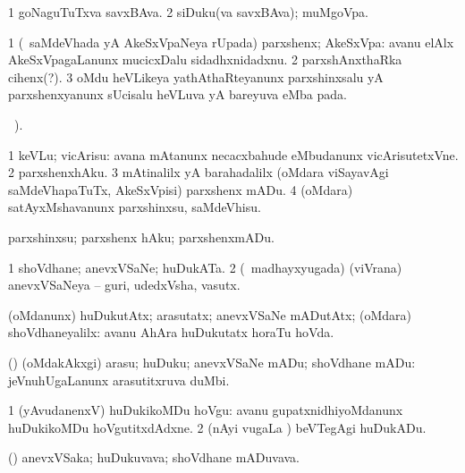 \bentry
{}
\gl{\nA}
\bmng
\bnum
\num{1} goNaguTuTxva savxBAva. 
\num{2} siDuku(va savxBAva); muMgoVpa. 
\enum
\emng
\eentry

\bentry
{}
\gl{\nA}
\bmng
\bnum
\num{1} (\kanmu\ saMdeVhada yA AkeSxVpaNeya rUpada) parxshenx; AkeSxVpa:  avanu elAlx AkeSxVpagaLanunx mucicxDalu sidadhxnidadxnu. 
\num{2} parxshAnxthaRka cihenx(?). 
\num{3} oMdu heVLikeya yathAthaRteyanunx parxshinxsalu yA parxshenxyanunx sUcisalu heVLuva yA bareyuva  eMba pada. 
\enum
\emng
\eentry

\bentry
{}
\gl{\kirx}
\BUkaq\ ). 

\noindent
\gl{\sakirx}
\bmng
\bnum
\num{1} keVLu; vicArisu:    avana mAtanunx necacxbahude eMbudanunx vicArisutetxVne. 
\num{2} parxshenxhAku. 
\num{3} mAtinalilx yA barahadalilx (oMdara viSayavAgi saMdeVhapaTuTx, AkeSxVpisi) parxshenx mADu. 
\num{4} (oMdara) satAyxMshavanunx parxshinxsu, saMdeVhisu. 
\enum
\emng

\noindent
\gl{\akirx}
\bmng
parxshinxsu; parxshenx hAku; parxshenxmADu. 
\emng
\eentry

\bentry
{}
\gl{\nA}
\bmng
\bnum
\num{1} shoVdhane; anevxVSaNe; huDukATa. 
\num{2} (\kanmu\ madhayxyugada) (viVrana) anevxVSaNeya -- guri, udedxVsha, vasutx. 
\enum
\emng

\noindent
\gl{\pagu}
\bmng
{} (oMdanunx) huDukutAtx; arasutatx; anevxVSaNe mADutAtx; (oMdara) shoVdhane\-yalilx:  avanu AhAra huDukutatx horaTu hoVda. 
\emng
\eentry

\bentry
{}
\gl{\sakirx}
\bmng
(\kAparx) (oMdakAkxgi) arasu; huDuku; anevxVSaNe mADu; shoVdhane mADu:   jeVnuhUgaLanunx arasutitxruva duMbi. 
\emng

\noindent
\gl{\akirx}
\expl{}
\bmng
\bnum
\num{1} (yAvudanenxV) huDukikoMDu hoVgu:  avanu gupatxnidhiyoMdanunx huDukikoMDu hoVgutitxdAdxne. 
\num{2} (nAyi \mo vugaLa \vi) beVTegAgi huDukADu. 
\enum
\emng
\eentry

\bentry
{}
\gl{\nA}
\bmng
(\kAparx) anevxVSaka; huDukuvava; shoVdhane mADuvava. 
\emng
\eentry

